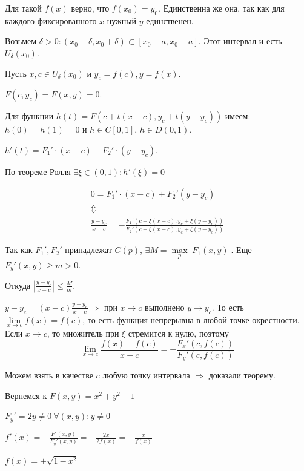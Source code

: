 Для такой \( f(x) \) верно, что \( f(x_0) = y_0 \).
Единственна же она, так как для каждого фиксированного \( x \) нужный \( y \) единственен.

Возьмем \( \delta > 0 : (x_0 - \delta, x_0 + \delta) \subset [x_0 - a, x_0 + a] \).
Этот интервал и есть \( U_{\delta} (x_0) \).

Пусть \( x, c \in U_{\delta} (x_0) \) и \( y_c = f(c), y = f(x) \).

\( F(c, y_c) = F(x, y) = 0 \).

Для функции \( h(t) = F(c + t(x - c), y_c + t(y - y_c)) \) имеем:
\( h(0) = h(1) = 0 \) и \( h \in C[0, 1] \), \( h \in D(0, 1) \).

\( h'(t) = F_1' \cdot (x - c) + F_2' \cdot (y - y_c) \).

По теореме Ролля \( \exists \xi \in (0, 1) : h'(\xi) = 0 \)

\begin{gather*}
    0 = F_1' \cdot (x - c) + F_2' (y - y_c)
    \\
    \Updownarrow
    \\
    \frac{y - y_c}{x - c} = - \frac{F_1'(c + \xi (x - c), y_c + \xi (y - y_c))}{F_2'(c + \xi (x - c), y_c + \xi (y - y_c))}
\end{gather*}

Так как \( F_1', F_2' \) принадлежат \( C(p) \), \( \exists M = \max\limits_{p} | F_1 (x, y) | \).
Еще \( F_y'(x, y) \geq m > 0 \).

Откуда \( \left| \frac{y - y_c}{x - c} \right| \leq \frac{M}{m} \).

\( y - y_c = (x - c) \frac{y - y_c}{x - c} \Rightarrow \) при \( x \to c \) выполнено \( y \to y_c \).
То есть \( \lim\limits_{x \to c} f(x) = f(c) \), то есть функция непрерывна в любой точке окрестности.
Если \( x \to c \), то множитель при \( \xi \) стремится к нулю, поэтому
\[
    \lim\limits_{x \to c} \frac{f(x) - f(c)}{x - c} = - \frac{F_x'(c, f(c))}{F_y'(c, f(c))}
\]

Можем взять в качестве \( c \) любую точку интервала \( \Rightarrow \) доказали теорему.

\begin{example}{}{}
    Вернемся к \( F(x, y) = x^2 + y^2 - 1 \)

    \( F_y' = 2y \neq 0 \ \forall (x, y) : y \neq 0 \)

    \( f'(x) = -\frac{F'(x, y)}{F_y'(x, y)} = -\frac{2x}{2f(x)} = -\frac{x}{f(x)} \)

    \( f(x) = \pm \sqrt{1 - x^2} \)
\end{example}

